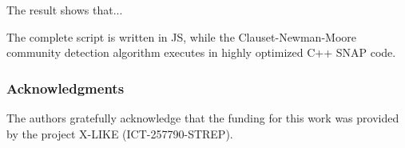 \documentclass{article} %
\begin{document}
The result shows that...

The complete script is written in JS, while the Clauset-Newman-Moore community detection algorithm \cite{clauset-newman-moore} executes in highly optimized C++ SNAP code.

\subsubsection*{Acknowledgments}
   The authors gratefully acknowledge that the funding for this work was provided by the project X-LIKE (ICT-257790-STREP)\cite{xlike}.




\end{document}
